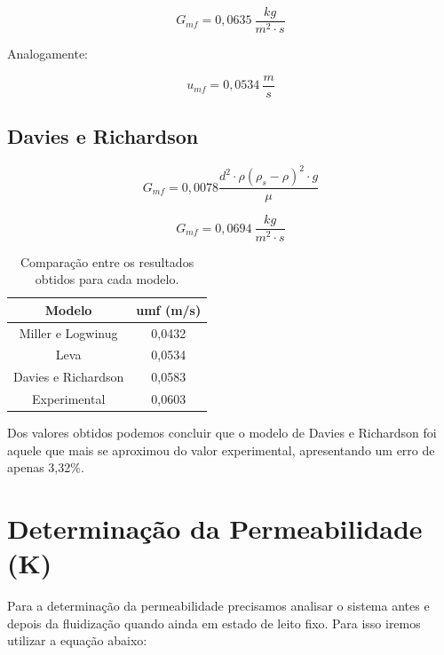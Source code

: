 \begin{equation}\label{key}
G_{m f}=0,0635 \ \dfrac{k g}{m^{2} \cdot s}
\end{equation}

Analogamente:

\begin{equation}\label{key}
u_{m f}=0,0534 \ \frac{m}{s}
\end{equation}

\subsection{Davies e Richardson}


\begin{equation}\label{key}
G_{m f}=0,0078 \dfrac{d^{2} \cdot \rho\left(\rho_{s}-\rho\right)^{2} \cdot g}{\mu}
\end{equation}

\begin{equation}\label{key}
G_{m f}=0,0694 \ \dfrac{k g}{m^{2} \cdot s}
\end{equation}

\begin{table}[H]
	\centering
	\begin{tabular}{|c|c|}
		\hline
		\textbf{Modelo}     & \textbf{umf (m/s)} \\ \hline
		Miller e  Logwinug  & 0,0432             \\ \hline
		Leva                & 0,0534             \\ \hline
		Davies e Richardson & 0,0583             \\ \hline
		Experimental        & 0,0603             \\ \hline
	\end{tabular}
	\caption{Comparação entre os resultados obtidos para cada modelo.}
	\label{tabmodel}
\end{table}


Dos valores obtidos podemos concluir que o modelo de Davies e Richardson foi aquele que mais se aproximou do valor experimental, apresentando um erro de apenas 3,32\%.

\section{Determinação da Permeabilidade (K)}

Para a determinação da permeabilidade precisamos analisar o sistema antes e depois da fluidização quando ainda em estado de leito fixo. Para isso iremos utilizar a equação abaixo:



